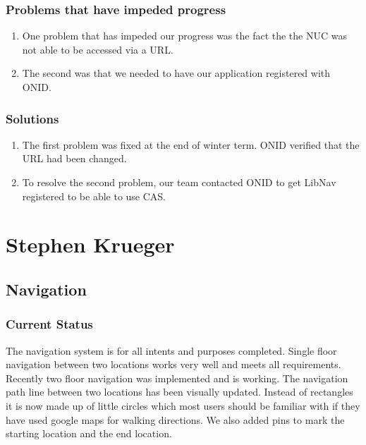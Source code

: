 \documentclass[letterpaper,10pt,serif,titlepage, onecolumn, compsoc]{IEEEtran}
\begin{document}
\subsubsection{Problems that have impeded progress}
\begin{enumerate}
	\item One problem that has impeded our progress was the fact the the NUC was not able to be accessed via a URL.
    \item The second was that we needed to have our application registered with ONID.
\end{enumerate}

\subsubsection{Solutions}
\begin{enumerate}
	\item The first problem was fixed at the end of winter term. ONID verified that the URL had been changed.
    \item To resolve the second problem, our team contacted ONID to get LibNav registered to be able to use CAS.
\end{enumerate}

\section{Stephen Krueger}

\subsection{Navigation}
\subsubsection{Current Status}
The navigation system is for all intents and purposes completed. Single floor navigation between two locations works very well and meets all requirements. Recently two floor navigation was implemented and is working. The navigation path line between two locations has been visually updated. Instead of rectangles it is now made up of little circles which most users should be familiar with if they have used google maps for walking directions. We also added pins to mark the starting location and the end location. 
\end{document}
